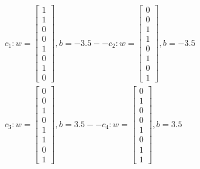 \documentclass[en]{university}
\begin{document}
\begin{gather*}
    c_1: w = \begin{bmatrix}
        1 \\
        1 \\
        0 \\
        0 \\
        1 \\
        0 \\
        1 \\
        0
    \end{bmatrix}, b = -3.5 --
    c_2: w = \begin{bmatrix}
        0 \\
        0 \\
        1 \\
        1 \\
        0 \\
        1 \\
        0 \\
        1
    \end{bmatrix}, b = -3.5 \\
    c_3: w = \begin{bmatrix}
        0 \\
        0 \\
        1 \\
        0 \\
        1 \\
        1 \\
        0 \\
        1
    \end{bmatrix}, b = 3.5 --
    c_4: w = \begin{bmatrix}
        0 \\
        1 \\
        0 \\
        0 \\
        1 \\
        0 \\
        1 \\
        1
    \end{bmatrix}, b = 3.5
\end{gather*}
\end{document}
